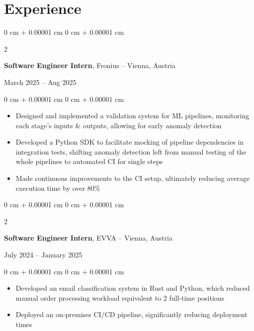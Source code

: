 \documentclass[10pt, letterpaper]{article}
\newenvironment{highlights}{
    \begin{itemize}[
        topsep=0.10 cm,
        parsep=0.10 cm,
        partopsep=0pt,
        itemsep=0pt,
        leftmargin=0 cm + 10pt
    ]
}{
    \end{itemize}
}
\newenvironment{onecolentry}{
    \begin{adjustwidth}{
        0 cm + 0.00001 cm
    }{
        0 cm + 0.00001 cm
    }
}{
    \end{adjustwidth}
}
\newenvironment{twocolentry}[2][]{
    \onecolentry
    \def\secondColumn{#2}
    \setcolumnwidth{\fill, 4.5 cm}
    \begin{paracol}{2}
}{
    \switchcolumn \raggedleft \secondColumn
    \end{paracol}
    \endonecolentry
}
\begin{document}
    \section{Experience}
        
    \begin{twocolentry}
        {March 2025 – Aug 2025}
        \textbf{Software Engineer Intern}, Fronius -- Vienna, Austria
    \end{twocolentry}

    \vspace{0.10 cm}
    
    \begin{onecolentry}
        \begin{highlights}
            \item Designed and implemented a validation system for ML pipelines, monitoring each stage's inputs \& outputs, allowing for early anomaly detection
            \item Developed a Python SDK to facilitate mocking of pipeline dependencies in integration tests, shifting anomaly detection left from manual testing of the whole pipelines to automated CI for single steps 
            \item Made continuous improvements to the CI setup, ultimately reducing average execution time by over 80\%
        \end{highlights}
    \end{onecolentry}

    \vspace{0.2 cm}

    \begin{twocolentry}
        {July 2024 – January 2025}
        \textbf{Software Engineer Intern}, EVVA -- Vienna, Austria
    \end{twocolentry}

    \vspace{0.05 cm}
    
    \begin{onecolentry}
        \begin{highlights}
            \item Developed an email classification system in Rust and Python, which reduced manual order processing workload equivalent to 2 full-time positions
            \item Deployed an on-premises CI/CD pipeline, significantly reducing deployment times 
        \end{highlights}
    \end{onecolentry}
\end{document}
